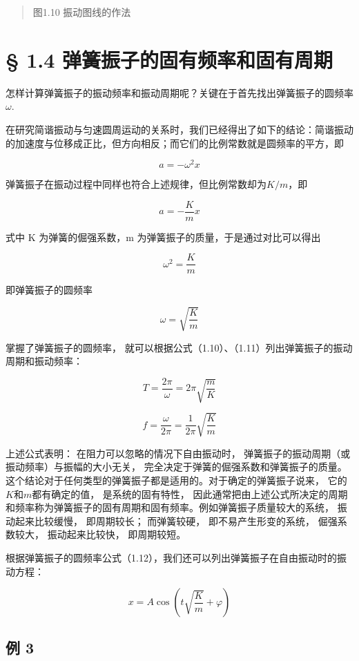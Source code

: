 \begin{quote}
图1.10 振动图线的作法
\end{quote}

\section{§ 1.4
弹簧振子的固有频率和固有周期}\label{ux5f39ux7c27ux632fux5b50ux7684ux56faux6709ux9891ux7387ux548cux56faux6709ux5468ux671f}

怎样计算弹簧振子的振动频率和振动周期呢？关键在于首先找出弹簧振子的圆频率\(\omega\).

在研究简谐振动与匀速圆周运动的关系时，我们已经得出了如下的结论：简谐振动的加速度与位移成正比，但方向相反；而它们的比例常数就是圆频率的平方，即

\[
a = - \omega^ {2} x
\]

弹簧振子在振动过程中同样也符合上述规律，但比例常数却为\(K / m\)，即

\[
a = - \frac {K}{m} x
\]

式中 K 为弹簧的倔强系数，m 为弹簧振子的质量，于是通过对比可以得出

\[
\omega^2=\frac{K}{m}
\]

即弹簧振子的圆频率

\[
\omega=\sqrt{\frac{K}{m}} \tag{1.12}
\]

掌握了弹簧振子的圆频率，
就可以根据公式（1.10）、（1.11）列出弹簧振子的振动周期和振动频率：

\[
T=\frac{2\pi}{\omega}=2\pi\sqrt{\frac{m}{K}} \tag{1.13}
\]

\[
f=\frac{\omega}{2\pi}=\frac{1}{2\pi}\sqrt{\frac{K}{m}} \tag{1.14}
\]

上述公式表明： 在阻力可以忽略的情况下自由振动时，
弹簧振子的振动周期（或振动频率）与振幅的大小无关，
完全决定于弹簧的倔强系数和弹簧振子的质量。这个结论对于任何类型的弹簧振子都是适用的。对于确定的弹簧振子说来，
它的\(K\)和\(m\)都有确定的值， 是系统的固有特性，
因此通常把由上述公式所决定的周期和频率称为弹簧振子的固有周期和固有频率。例如弹簧振子质量较大的系统，
振动起来比较缓慢， 即周期较长； 而弹簧较硬， 即不易产生形变的系统，
倔强系数较大， 振动起来比较快， 即周期较短。

根据弹簧振子的圆频率公式（1.12），我们还可以列出弹簧振子在自由振动时的振动方程：

\[
x = A \cos \left(t \sqrt {\frac {K}{m}} + \varphi\right) \tag {1.15}
\]

\subsection{例 3}\label{ux4f8b-3}


